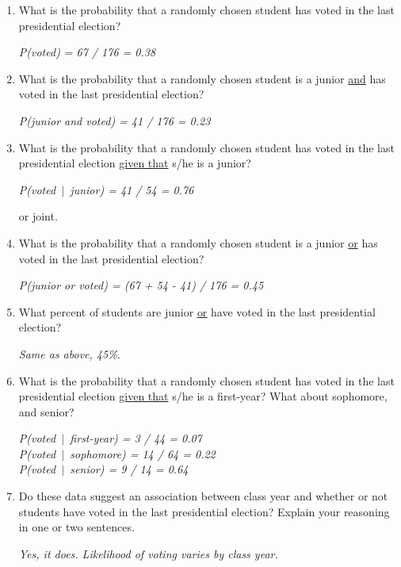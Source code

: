 \documentclass[12pt]{article}
\newcommand{\soln}[2]{\textit{\textcolor{custom_red}{#2}}}{}
\begin{document}
\begin{enumerate}

\item  What is the probability that a randomly chosen student has voted in the last 
presidential election?

\soln{2cm}{P(voted) = 67 / 176 = 0.38}

\item What is the probability that a randomly chosen student is a junior \underline{and} 
has voted in the last presidential election?

\soln{2cm}{P(junior and voted) = 41 / 176 = 0.23}

\item What is the probability that a randomly chosen student  has voted in the last presidential 
election \underline{given that} s/he is a junior?

\soln{2cm}{P(voted~$|$~junior) = 41 / 54 = 0.76}

or joint.


\item What is the probability that a randomly chosen student is a junior \underline{or} 
has voted in the last presidential election?

\soln{2cm}{P(junior or voted) = (67 + 54 - 41) / 176 =  0.45}

\item What percent of students are junior \underline{or} have voted in the last 
presidential election?

\soln{1cm}{Same as above, 45\%.}

\item What is the probability that a randomly chosen student has voted in the last presidential 
election \underline{given that} s/he is a first-year? What about sophomore, and senior?

\soln{2cm}{P(voted~$|$~first-year) = 3 / 44 = 0.07 \\
P(voted~$|$~sophomore) = 14 / 64 = 0.22 \\
P(voted~$|$~senior) = 9 / 14 = 0.64}

\item Do these data suggest an association between class year and whether or not 
students have voted in the last presidential election? Explain your reasoning in one or 
two sentences.

\soln{2cm}{Yes, it does. Likelihood of voting varies by class year.}

\end{enumerate}
\end{document}
